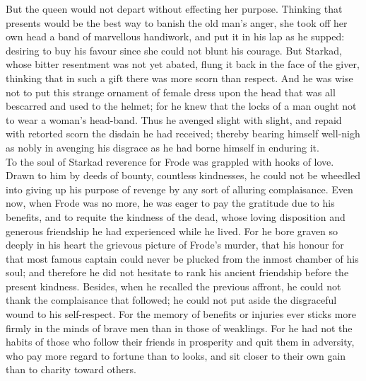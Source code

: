 \documentclass[10pt,a4paper]{report}
\begin{document}
But the queen would not depart without effecting her purpose. Thinking that presents would be the best way to banish the old man's anger, she took off her own head a band of marvellous handiwork, and put it in his lap as he supped: desiring to buy his favour since she could not blunt his courage. But Starkad, whose bitter resentment was not yet abated, flung it back in the face of the giver, thinking that in such a gift there was more scorn than respect. And he was wise not to put this strange ornament of female dress upon the head that was all bescarred and used to the helmet; for he knew that the locks of a man ought not to wear a woman's head-band. Thus he avenged slight with slight, and repaid with retorted scorn the disdain he had received; thereby bearing himself well-nigh as nobly in avenging his disgrace as he had borne himself in enduring it.\\

To the soul of Starkad reverence for Frode was grappled with hooks of love. Drawn to him by deeds of bounty, countless kindnesses, he could not be wheedled into giving up his purpose of revenge by any sort of alluring complaisance. Even now, when Frode was no more, he was eager to pay the gratitude due to his benefits, and to requite the kindness of the dead, whose loving disposition and generous friendship he had experienced while he lived. For he bore graven so deeply in his heart the grievous picture of Frode's murder, that his honour for that most famous captain could never be plucked from the inmost chamber of his soul; and therefore he did not hesitate to rank his ancient friendship before the present kindness. Besides, when he recalled the previous affront, he could not thank the complaisance that followed; he could not put aside the disgraceful wound to his self-respect. For the memory of benefits or injuries ever sticks more firmly in the minds of brave men than in those of weaklings. For he had not the habits of those who follow their friends in prosperity and quit them in adversity, who pay more regard to fortune than to looks, and sit closer to their own gain than to charity toward others.\\
\end{document}
